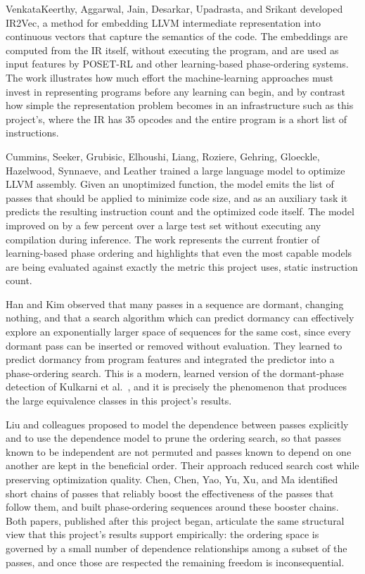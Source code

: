 VenkataKeerthy, Aggarwal, Jain, Desarkar, Upadrasta, and Srikant \cite{venkatakeerthy2020} developed IR2Vec, a method for embedding LLVM intermediate representation into continuous vectors that capture the semantics of the code. The embeddings are computed from the IR itself, without executing the program, and are used as input features by POSET-RL and other learning-based phase-ordering systems. The work illustrates how much effort the machine-learning approaches must invest in representing programs before any learning can begin, and by contrast how simple the representation problem becomes in an infrastructure such as this project's, where the IR has 35 opcodes and the entire program is a short list of instructions.

Cummins, Seeker, Grubisic, Elhoushi, Liang, Roziere, Gehring, Gloeckle, Hazelwood, Synnaeve, and Leather \cite{cummins2023} trained a large language model to optimize LLVM assembly. Given an unoptimized function, the model emits the list of passes that should be applied to minimize code size, and as an auxiliary task it predicts the resulting instruction count and the optimized code itself. The model improved on  by a few percent over a large test set without executing any compilation during inference. The work represents the current frontier of learning-based phase ordering and highlights that even the most capable models are being evaluated against exactly the metric this project uses, static instruction count.

Han and Kim \cite{han2024} observed that many passes in a sequence are dormant, changing nothing, and that a search algorithm which can predict dormancy can effectively explore an exponentially larger space of sequences for the same cost, since every dormant pass can be inserted or removed without evaluation. They learned to predict dormancy from program features and integrated the predictor into a phase-ordering search. This is a modern, learned version of the dormant-phase detection of Kulkarni et al.\ \cite{kulkarni2004}, and it is precisely the phenomenon that produces the large equivalence classes in this project's results.

Liu and colleagues \cite{liu2024} proposed to model the dependence between passes explicitly and to use the dependence model to prune the ordering search, so that passes known to be independent are not permuted and passes known to depend on one another are kept in the beneficial order. Their approach reduced search cost while preserving optimization quality. Chen, Chen, Yao, Yu, Xu, and Ma \cite{chen2025} identified short chains of passes that reliably boost the effectiveness of the passes that follow them, and built phase-ordering sequences around these booster chains. Both papers, published after this project began, articulate the same structural view that this project's results support empirically: the ordering space is governed by a small number of dependence relationships among a subset of the passes, and once those are respected the remaining freedom is inconsequential.

